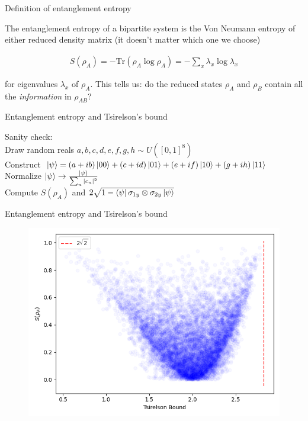 \documentclass[aspectratio=1610]{beamer}					%
\begin{document}
\begin{frame}{Definition of entanglement entropy}

The entanglement entropy of a bipartite system is the Von Neumann entropy of either reduced density matrix (it doesn't matter which one we choose)

\begin{align*}
S(\rho_{A}) = -\mathrm{Tr}(\rho_{A}\log\rho_{A}) = -\sum_{x}\lambda_{x}\log\lambda_{x}
\end{align*}

for eigenvalues $\lambda_{x}$ of $\rho_{A}$. This tells us: do the reduced states $\rho_{A}$ and $\rho_{B}$ contain all the \emph{information} in $\rho_{AB}$?

\end{frame}

\begin{frame}{Entanglement entropy and Tsirelson's bound}

Sanity check:\\
\vspace{0.2in}
Draw random reals $a,b,c,d,e,f,g,h\sim U([0,1]^{8})$\\
\vspace{0.2in}
Construct $\ket{\psi} = (a+ib)\ket{00} + (c+id)\ket{01} + (e+if)\ket{10} + (g+ih)\ket{11}$\\
\vspace{0.2in}
Normalize $\ket{\psi} \rightarrow \frac{\ket{\psi}}{\sum_{n}|c_{n}|^{2}}$\\
\vspace{0.2in}
Compute $S(\rho_{A})$ and $2\sqrt{1-\bra{\psi}\sigma_{1y}\otimes\sigma_{2y}\ket{\psi}}$
\end{frame}

\begin{frame}{Entanglement entropy and Tsirelson's bound}

\begin{figure}
\includegraphics[scale=0.65]{bell.png}
\end{figure}

\end{frame}
\end{document}

